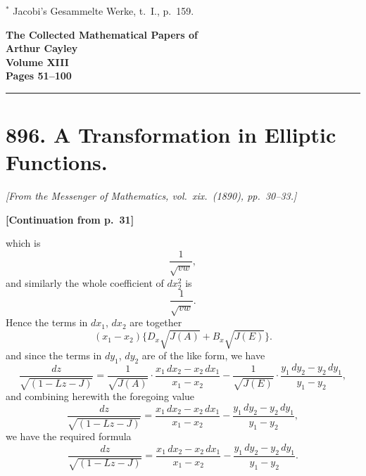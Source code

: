 \documentclass[11pt,a4paper]{book}
\begin{document}
\begin{flushright}
$^*$ Jacobi's Gesammelte Werke, t.\ I., p.\ 159.
\end{flushright}
\clearpage


\begin{center}
\Large\textbf{The Collected Mathematical Papers of}\\[4pt]
\LARGE\textbf{Arthur Cayley}\\[8pt]
\Large\textbf{Volume XIII}\\[12pt]
\large\textbf{Pages 51--100}
\end{center}

\vspace{1em}
\hrule
\vspace{1.5em}


\section*{896. A Transformation in Elliptic Functions.}

\noindent\textit{[From the Messenger of Mathematics, vol.\ xix.\ (1890), pp.\ 30--33.]}

\vspace{0.5em}
\noindent\textbf{[Continuation from p.\ 31]}

which is
$$
\frac{1}{\sqrt{vw}},
$$
and similarly the whole coefficient of $dx_2^2$ is
$$
\frac{1}{\sqrt{vw}}.
$$
Hence the terms in $dx_1$, $dx_2$ are together
$$
(x_1 - x_2)\{D_x\sqrt{J(A)} + B_x\sqrt{J(E)}\}.
$$
and since the terms in $dy_1$, $dy_2$ are of the like form, we have
$$
\frac{dz}{\sqrt{(1 - Lz - J)}} = \frac{1}{\sqrt{J(A)}} \cdot \frac{x_1\,dx_2 - x_2\,dx_1}{x_1 - x_2} - \frac{1}{\sqrt{J(E)}} \cdot \frac{y_1\,dy_2 - y_2\,dy_1}{y_1 - y_2},
$$
and combining herewith the foregoing value
$$
\frac{dz}{\sqrt{(1 - Lz - J)}} = \frac{x_1\,dx_2 - x_2\,dx_1}{x_1 - x_2} - \frac{y_1\,dy_2 - y_2\,dy_1}{y_1 - y_2},
$$
we have the required formula
$$
\frac{dz}{\sqrt{(1 - Lz - J)}} = \frac{x_1\,dx_2 - x_2\,dx_1}{x_1 - x_2} - \frac{y_1\,dy_2 - y_2\,dy_1}{y_1 - y_2}.
$$
\end{document}
